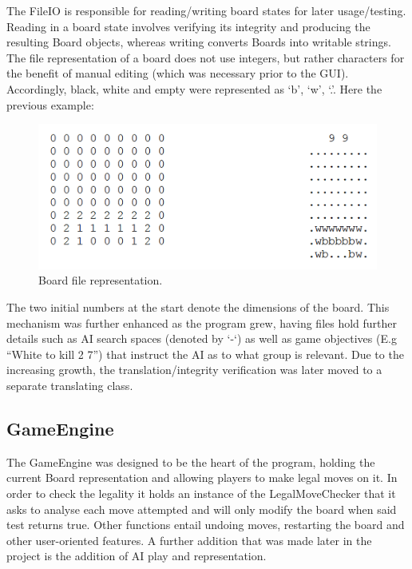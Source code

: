 \documentclass{l3proj}
\begin{document}
The FileIO is responsible for reading/writing board states for later usage/testing. Reading in a board state involves verifying its integrity and producing the resulting Board objects, whereas writing converts Boards into writable strings. The file representation of a board does not use integers, but rather characters for the benefit of manual editing (which was necessary prior to the GUI). Accordingly, black, white and empty were represented as ‘b’, ‘w’, ‘.’. Here the previous example:

\begin{figure}[H]
\centering
\includegraphics[scale=1]{Images/GE-BoardSave.png}
\caption{Board file representation.}
\end{figure}

The two initial numbers at the start denote the dimensions of the board. This mechanism was further enhanced as the program grew, having files hold further details such as AI search spaces (denoted by ‘-‘) as well as game objectives (E.g “White to kill 2 7”) that instruct the AI as to what group is relevant. Due to the increasing growth, the translation/integrity verification was later moved to a separate translating class.

\subsection{GameEngine}

The GameEngine was designed to be the heart of the program, holding the current Board representation and allowing players to make legal moves on it. In order to check the legality it holds an instance of the LegalMoveChecker that it asks to analyse each move attempted and will only modify the board when said test returns true. Other functions entail undoing moves, restarting the board and other user-oriented features. A further addition that was made later in the project is the addition of AI play and representation. 
\end{document}
